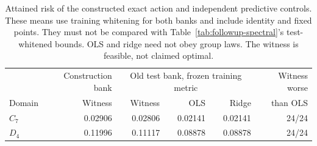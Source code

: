 \begin{table}[t]
\centering\small
\begin{tabular}{@{}lrrrrr@{}}
\toprule
& Construction bank & \multicolumn{3}{c}{Old test bank, frozen training metric} & Witness worse \\
Domain & Witness & Witness & OLS & Ridge & than OLS \\
\midrule
$C_7$ & 0.02906 & 0.02806 & 0.02141 & 0.02141 & 24/24 \\
$D_4$ & 0.11996 & 0.11117 & 0.08878 & 0.08878 & 24/24 \\
\bottomrule
\end{tabular}
\caption{Attained risk of the constructed exact action and independent predictive controls. These means use training whitening for both banks and include identity and fixed points. They must not be compared with Table~\ref{tab:followup-spectral}'s test-whitened bounds. OLS and ridge need not obey group laws. The witness is feasible, not claimed optimal.}
\label{tab:followup-witness}
\end{table}
